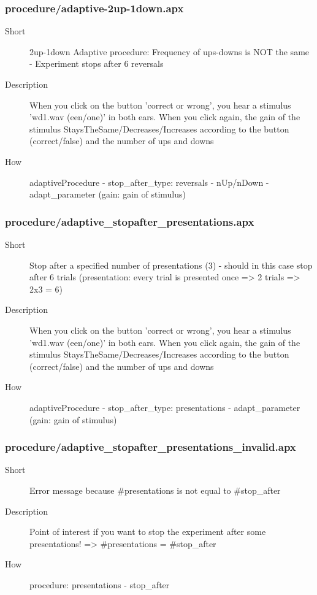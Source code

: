 \subsubsection{procedure/adaptive-2up-1down.apx}
\begin{description}
\item[Short] 
 2up-1down Adaptive procedure: Frequency of ups-downs is NOT the same - Experiment stops after 6 reversals
\item[Description] 
 When you click on the button 'correct or wrong', you hear a stimulus 'wd1.wav (een/one)' in both ears. When you click again, the gain of the stimulus StaysTheSame/Decreases/Increases according to the button (correct/false) and the number of ups and downs
\item[How] 
 adaptiveProcedure - stop\_after\_type: reversals - nUp/nDown - adapt\_parameter (gain: gain of stimulus)
\end{description}

\subsubsection{procedure/adaptive\_stopafter\_presentations.apx}
\begin{description}
\item[Short] 
 Stop after a specified number of presentations (3) - should in this case stop after 6 trials (presentation: every trial is presented once =\textgreater{} 2 trials =\textgreater{} 2x3 = 6)
\item[Description] 
 When you click on the button 'correct or wrong', you hear a stimulus 'wd1.wav (een/one)' in both ears. When you click again, the gain of the stimulus StaysTheSame/Decreases/Increases according to the button (correct/false) and the number of ups and downs
\item[How] 
 adaptiveProcedure - stop\_after\_type: presentations - adapt\_parameter (gain: gain of stimulus)
\end{description}

\subsubsection{procedure/adaptive\_stopafter\_presentations\_invalid.apx}
\begin{description}
\item[Short] 
 Error message because \#presentations is not equal to \#stop\_after
\item[Description] 
 Point of interest if you want to stop the experiment after some presentations! =\textgreater{} \#presentations = \#stop\_after
\item[How] 
 procedure: presentations - stop\_after
\end{description}

